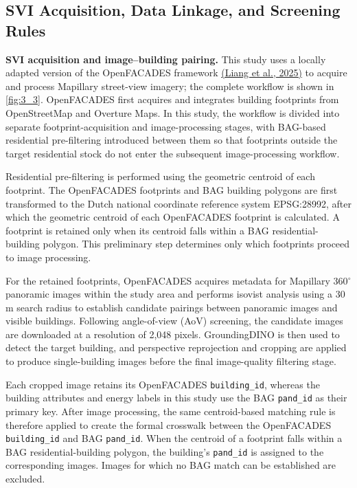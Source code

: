 \subsection{SVI Acquisition, Data Linkage, and Screening Rules}
\label{sec:3_2_2}


\textbf{SVI acquisition and image--building pairing.} This study uses a locally adapted version of the OpenFACADES framework \hyperlink{ref:liang2025}{(Liang et al., 2025)} to acquire and process Mapillary street-view imagery; the complete workflow is shown in \cref{fig:3_3}. OpenFACADES first acquires and integrates building footprints from OpenStreetMap and Overture Maps. In this study, the workflow is divided into separate footprint-acquisition and image-processing stages, with BAG-based residential pre-filtering introduced between them so that footprints outside the target residential stock do not enter the subsequent image-processing workflow.


Residential pre-filtering is performed using the geometric centroid of each footprint. The OpenFACADES footprints and BAG building polygons are first transformed to the Dutch national coordinate reference system EPSG:28992, after which the geometric centroid of each OpenFACADES footprint is calculated. A footprint is retained only when its centroid falls within a BAG residential-building polygon. This preliminary step determines only which footprints proceed to image processing.


For the retained footprints, OpenFACADES acquires metadata for Mapillary 360\ensuremath{^\circ} panoramic images within the study area and performs isovist analysis using a 30 m search radius to establish candidate pairings between panoramic images and visible buildings. Following angle-of-view (AoV) screening, the candidate images are downloaded at a resolution of 2,048 pixels. GroundingDINO is then used to detect the target building, and perspective reprojection and cropping are applied to produce single-building images before the final image-quality filtering stage.


Each cropped image retains its OpenFACADES \texttt{building\_id}, whereas the building attributes and energy labels in this study use the BAG \texttt{pand\_id} as their primary key. After image processing, the same centroid-based matching rule is therefore applied to create the formal crosswalk between the OpenFACADES \texttt{building\_id} and BAG \texttt{pand\_id}. When the centroid of a footprint falls within a BAG residential-building polygon, the building's \texttt{pand\_id} is assigned to the corresponding images. Images for which no BAG match can be established are excluded.


